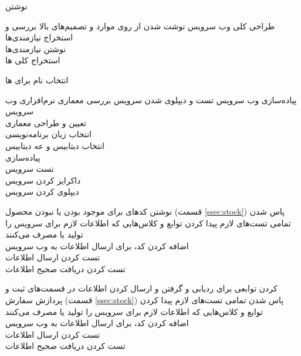 \begin{wbsbox}{نوشتن }
\begin{wbssub}
{طراحی کلی وب ‌سرویس}
{نوشت شدن  از روی موارد و تصمیم‌های بالا}
\task
بررسی و استخراج نیازمندی‌ها \\
\task
نوشتن نیازمندی‌ها \\
\task
استخراج کلی
ها

\task
انتخاب نام برای ها
\end{wbssub}

\begin{wbssub}
{پیاده‌سازی وب ‌سرویس}
{تست و دیپلوی شدن سرویس}
\task
بررسی معماری نرم‌افزاری وب سرویس \\
\task
تعیین و طراحی معماری \\
\task
انتخاب زبان برنامه‌نویسی \\
\task
انتخاب دیتابیس و  عه دیتابیس \\
\task
پیاده‌سازی \\
\task
تست سرویس \\
\task
داکرایز کردن سرویس \\
\task
دیپلوی کردن سرویس
\end{wbssub}

\begin{wbssub}
{نوشتن کد‌های
برای موجود بودن یا نبودن محصول
(قسمت \ref{ssec:stock}\hspace{1mm})}
{پاس شدن تمامی تست‌های لازم}
\task 
پیدا کردن توابع و کلاس‌هایی که اطلاعات لازم برای سرویس را تولید یا مصرف می‌کنند \\
\task 
اضافه کردن کد، برای ارسال اطلاعات به وب ‌سرویس \\
\task
تست کردن ارسال اطلاعات \\
\task
تست کردن دریافت صحیح اطلاعات
\end{wbssub}

\begin{wbssub}
{ کردن توابعی برای ردیابی و گرفتن و ارسال کردن اطلاعات در قسمت‌های ثبت و پردازش سفارش (قسمت \ref{ssec:stock}\hspace{1mm})}
{پاس شدن تمامی تست‌های لازم}
\task 
پیدا کردن توابع و کلاس‌هایی که اطلاعات لازم برای سرویس را تولید یا مصرف می‌کنند \\
\task 
اضافه کردن کد، برای ارسال اطلاعات به وب ‌سرویس \\
\task
تست کردن ارسال اطلاعات \\
\task
تست کردن دریافت صحیح اطلاعات
\end{wbssub}


\end{wbsbox}
